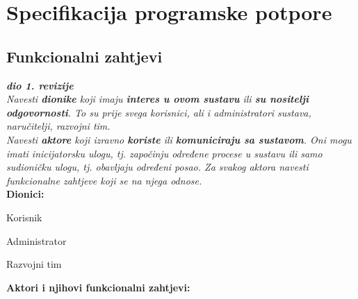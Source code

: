 \chapter{Specifikacija programske potpore}
		
	\section{Funkcionalni zahtjevi}
			
			\textbf{\textit{dio 1. revizije}}\\
			
			\textit{Navesti \textbf{dionike} koji imaju \textbf{interes u ovom sustavu} ili  \textbf{su nositelji odgovornosti}. To su prije svega korisnici, ali i administratori sustava, naručitelji, razvojni tim.}\\
				
			\textit{Navesti \textbf{aktore} koji izravno \textbf{koriste} ili \textbf{komuniciraju sa sustavom}. Oni mogu imati inicijatorsku ulogu, tj. započinju određene procese u sustavu ili samo sudioničku ulogu, tj. obavljaju određeni posao. Za svakog aktora navesti funkcionalne zahtjeve koji se na njega odnose.}\\
			
			
			\noindent \textbf{Dionici:}
			
			\begin{packed_enum}
				
				\item Korisnik
				\item Administrator				
				\item Razvojni tim
				
			\end{packed_enum}
			
			\noindent \textbf{Aktori i njihovi funkcionalni zahtjevi:}
			
